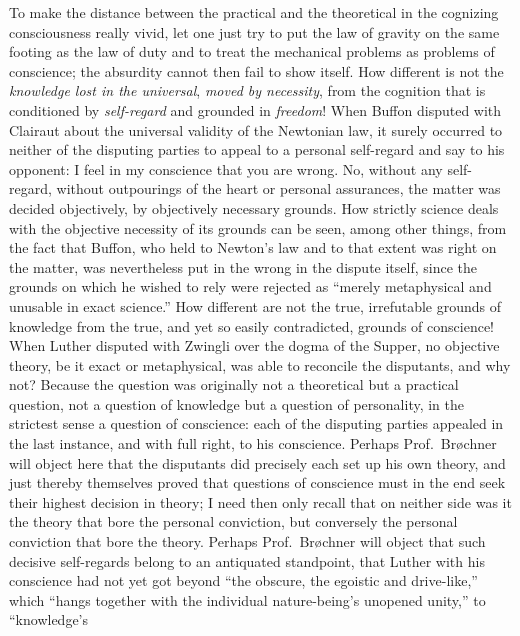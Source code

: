 \documentclass[12pt]{book}
\newcommand{\opage}[1]{\marginnote{\footnotesize\textit{[#1]}}}
\begin{document}
To make the distance between the practical and the theoretical in the
cognizing consciousness really vivid, let one just try to put the law of
gravity on the same footing as the law of duty and to treat the
mechanical problems as problems of conscience; the absurdity cannot then
fail to show itself. How different is not the \emph{knowledge lost in the
universal}, \emph{moved by necessity}, from the cognition that is
conditioned by \emph{self-regard} and grounded in \emph{freedom}! When Buffon
disputed with Clairaut about the universal validity of the Newtonian law,
it surely occurred to neither of the disputing parties to appeal to a
personal self-regard and say to his opponent: I feel in my conscience
that you are wrong. No, without any self-regard, without outpourings of
the heart or personal assurances, the matter was decided objectively, by
objectively necessary grounds. How strictly science deals with the
objective necessity of its grounds can be seen, among other things, from
the fact that Buffon, who held to Newton's law and to that extent was right
on the matter, was nevertheless put in the wrong in the dispute itself,
since the grounds on which he wished to rely were rejected as ``merely
metaphysical and unusable in exact science.'' How different are not the
true, irrefutable grounds of knowledge from the true, and yet so easily
contradicted, grounds of conscience! When Luther disputed with Zwingli over the
dogma of the Supper, no objective theory, be it exact or metaphysical,
was able to reconcile the disputants, and why not? Because the question
was originally not a theoretical but a practical question, not a question
of knowledge but a question of personality, in the strictest sense a
question of conscience: each of the disputing parties appealed in the last
instance, and with
\opage{30}\setcounter{footnote}{0}%
full right, to his conscience. Perhaps Prof.~Brøchner will object here
that the disputants did precisely each set up his own theory, and just
thereby themselves proved that questions of conscience must in the end
seek their highest decision in theory; I need then only recall that on
neither side was it the theory that bore the personal conviction, but
conversely the personal conviction that bore the theory. Perhaps
Prof.~Brøchner will object that such decisive self-regards belong to an
antiquated standpoint, that Luther with his conscience had not yet got
beyond ``the obscure, the egoistic and drive-like,'' which ``hangs together
with the individual nature-being's unopened unity,'' to ``knowledge's
\end{document}
